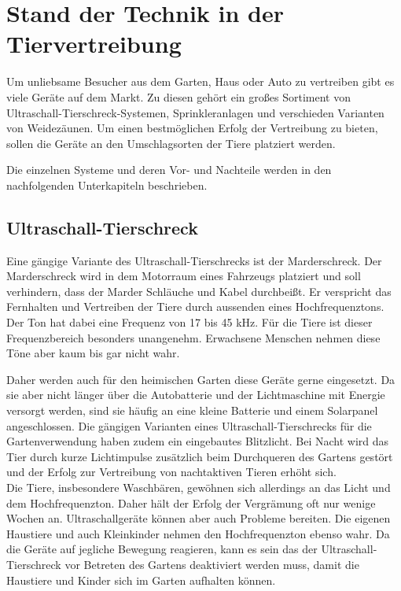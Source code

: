 
\section{Stand der Technik in der Tiervertreibung}

Um unliebsame Besucher aus dem Garten, Haus oder Auto zu vertreiben gibt es viele Geräte auf dem Markt. Zu diesen gehört ein großes Sortiment von Ultraschall-Tierschreck-Systemen, Sprinkleranlagen und verschieden Varianten von Weidezäunen. Um einen bestmöglichen Erfolg der Vertreibung zu bieten, sollen die Geräte an den Umschlagsorten der Tiere platziert werden.

Die einzelnen Systeme und deren Vor- und Nachteile werden in den nachfolgenden Unterkapiteln beschrieben.

\subsection{Ultraschall-Tierschreck} \label{ton_schreck}

Eine gängige Variante des Ultraschall-Tierschrecks ist der Marderschreck. Der Marderschreck wird in dem Motorraum eines Fahrzeugs platziert und soll verhindern, dass der Marder Schläuche und Kabel durchbeißt. Er verspricht das Fernhalten und Vertreiben der Tiere durch aussenden eines Hochfrequenztons. Der Ton hat dabei eine Frequenz von 17 bis 45 kHz. Für die Tiere ist dieser Frequenzbereich besonders unangenehm. Erwachsene Menschen nehmen diese Töne aber kaum bis gar nicht wahr. \cite{marderschreck}

Daher werden auch für den heimischen Garten diese Geräte gerne eingesetzt. Da sie aber nicht länger über die Autobatterie und der Lichtmaschine mit Energie versorgt werden, sind sie häufig an eine kleine Batterie und einem Solarpanel angeschlossen. Die gängigen Varianten eines Ultraschall-Tierschrecks für die Gartenverwendung haben zudem ein eingebautes Blitzlicht. Bei Nacht wird das Tier durch kurze Lichtimpulse zusätzlich beim Durchqueren des Gartens gestört und der Erfolg zur Vertreibung von nachtaktiven Tieren erhöht sich.
\\
Die Tiere, insbesondere Waschbären, gewöhnen sich allerdings an das Licht und dem Hochfrequenzton. Daher hält der Erfolg der Vergrämung oft nur wenige Wochen an.
Ultraschallgeräte können aber auch Probleme bereiten. Die eigenen Haustiere und auch Kleinkinder nehmen den Hochfrequenzton ebenso wahr. Da die Geräte auf jegliche Bewegung reagieren, kann es sein das der Ultraschall-Tierschreck vor Betreten des Gartens deaktiviert werden muss, damit die Haustiere und Kinder sich im Garten aufhalten können.\cite{anti_wasch}


